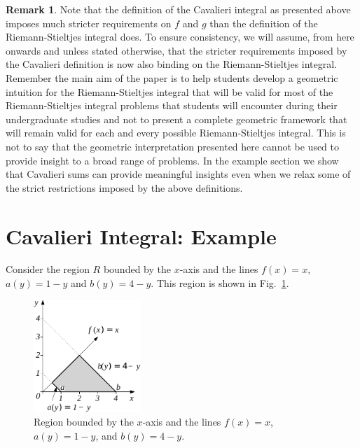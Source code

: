 \documentclass{article}
\theoremstyle{theorem}
\theoremstyle{definition}
\newtheorem*{remark}{Remark}
\begin{document}
\begin{remark}
Note that the definition of the Cavalieri integral as presented above imposes much stricter requirements on $f$ and $g$ than the 
definition of the Riemann-Stieltjes integral does. To ensure consistency, we will assume, from here onwards and unless stated otherwise, that the stricter requirements imposed 
by the Cavalieri definition is now also binding on the Riemann-Stieltjes integral. Remember the main aim of the paper is to 
help students develop a geometric intuition for the Riemann-Stieltjes integral that will be valid for most of the 
Riemann-Stieltjes integral problems that students will encounter during their undergraduate studies and not to present a complete geometric framework 
that will remain valid for each and every possible Riemann-Stieltjes integral. This is not to say that the geometric interpretation presented here cannot be used to provide 
insight to a broad range of problems. In the example section we show that Cavalieri sums can provide meaningful insights even 
when we relax some of the strict restrictions imposed by the above definitions.
\end{remark}

\section{Cavalieri Integral: Example}

Consider the region $R$ bounded by the $x$-axis and the lines $f(x)=x$, $a(y)=1-y$ and $b(y)=4-y$. This region is shown in Fig.~\ref{fig:ex1}.\\
\begin{figure}[htb]
\centering
\includegraphics[width=0.36\textwidth]{fig12}
\caption{Region bounded by the $x$-axis and the lines $f(x)=x$, $a(y)=1-y$, and $b(y)=4-y$.}
\label{fig:ex1}
\end{figure}
\end{document}
